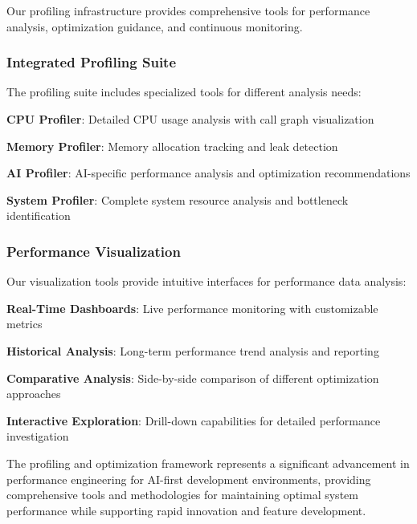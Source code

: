 Our profiling infrastructure provides comprehensive tools for performance analysis, optimization guidance, and continuous monitoring.

\subsubsection*{Integrated Profiling Suite}

The profiling suite includes specialized tools for different analysis needs:

\begin{expandedlist}
    \item \textbf{CPU Profiler}: Detailed CPU usage analysis with call graph visualization
    \item \textbf{Memory Profiler}: Memory allocation tracking and leak detection
    \item \textbf{AI Profiler}: AI-specific performance analysis and optimization recommendations
    \item \textbf{System Profiler}: Complete system resource analysis and bottleneck identification
\end{expandedlist}

\subsubsection*{Performance Visualization}

Our visualization tools provide intuitive interfaces for performance data analysis:

\begin{compactlist}
    \item \textbf{Real-Time Dashboards}: Live performance monitoring with customizable metrics
    \item \textbf{Historical Analysis}: Long-term performance trend analysis and reporting
    \item \textbf{Comparative Analysis}: Side-by-side comparison of different optimization approaches
    \item \textbf{Interactive Exploration}: Drill-down capabilities for detailed performance investigation
\end{compactlist}

The profiling and optimization framework represents a significant advancement in performance engineering for AI-first development environments, providing comprehensive tools and methodologies for maintaining optimal system performance while supporting rapid innovation and feature development.
